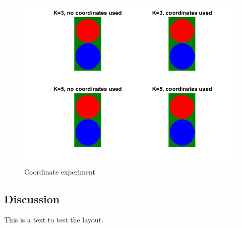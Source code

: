 \begin{figure}[h]
\includegraphics[width = 0.9\linewidth]{figures/task2/simple_coordinates.png}
\caption{Coordinate experiment}
\label{fig:simple:coords}
\end{figure}

\subsection{Discussion}

This is a text to test the layout.